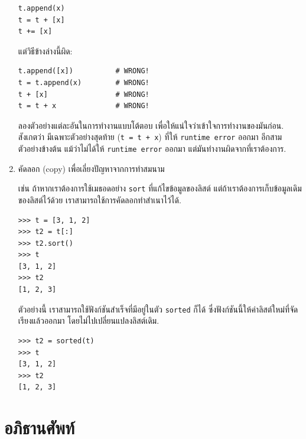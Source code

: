 \begin{enumerate}
\begin{verbatim}
t.append(x)
t = t + [x]
t += [x]
\end{verbatim}

แต่วิธีข้างล่างนี้ผิด:

\begin{verbatim}
t.append([x])          # WRONG!
t = t.append(x)        # WRONG!
t + [x]                # WRONG!
t = t + x              # WRONG!
\end{verbatim}

ลองตัวอย่างแต่ละอันในการทำงานแบบโต้ตอบ เพื่อให้แน่ใจว่าเข้าใจการทำงานของมันก่อน.
สังเกตว่า มีเฉพาะตัวอย่างสุดท้าย (\verb|t = t + x|) ที่ให้ \texttt{runtime error} ออกมา
อีกสามตัวอย่างข้างต้น แม้ว่าไม่ได้ให้ \texttt{runtime error} ออกมา แต่มันทำงานผิดจากที่เราต้องการ.

\item คัดลอก (copy) เพื่อเลี่ยงปัญหาจากการทำสมนาม

เช่น ถ้าหากเราต้องการใช้เมธอดอย่าง \texttt{sort} ที่แก้ไขข้อมูลของลิสต์
แต่ถ้าเราต้องการเก็บข้อมูลเดิมของลิสต์ไว้ด้วย
เราสามารถใช้การคัดลอกทำสำเนาไว้ได้.

\begin{verbatim}
>>> t = [3, 1, 2]
>>> t2 = t[:]
>>> t2.sort()
>>> t
[3, 1, 2]
>>> t2
[1, 2, 3]
\end{verbatim}

ตัวอย่างนี้ เราสามารถใช้ฟังก์ชันสำเร็จที่มีอยู่ในตัว \texttt{sorted} ก็ได้
ซึ่งฟังก์ชันนี้ให้ค่าลิสต์ใหม่ที่จัดเรียงแล้วออกมา โดยไม่ไปเปลี่ยนแปลงลิสต์เดิม.

\begin{verbatim}
>>> t2 = sorted(t)
>>> t
[3, 1, 2]
>>> t2
[1, 2, 3]
\end{verbatim}

\end{enumerate}



\section{อภิธานศัพท์}

